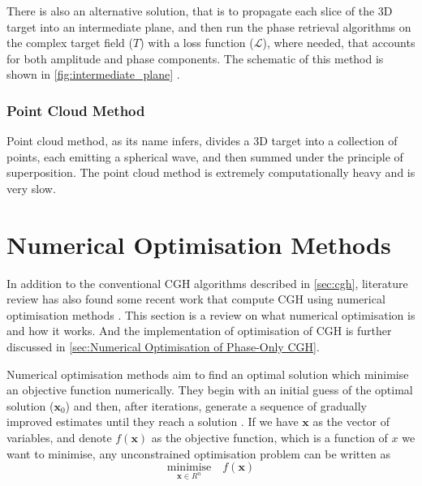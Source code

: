 There is also an alternative solution, that is to propagate each slice of the 3D target into an intermediate plane, and then run the phase retrieval algorithms on the complex target field ($T$) with a loss function ($\mathcal{L} $), where needed, that accounts for both amplitude and phase components. The schematic of this method is shown in \cref{fig:intermediate_plane} \cite{Chen2021}.


\subsubsection{Point Cloud Method}
Point cloud method, as its name infers, divides a 3D target into a collection of points, each emitting a spherical wave, and then summed under the principle of superposition. The point cloud method is extremely computationally heavy and is very slow.



\newpage
\section{Numerical Optimisation Methods} \label{sec:Numerical Optimisation Methods}
In addition to the conventional CGH algorithms described in \cref{sec:cgh}, literature review has also found some recent work that compute CGH using numerical optimisation methods \cite{Zhang2017, Liu2020, Choi2021, Chen2021, Kadis2022}. This section is a review on what numerical optimisation is and how it works. And the implementation of optimisation of CGH is further discussed in \cref{sec:Numerical Optimisation of Phase-Only CGH}.

Numerical optimisation methods aim to find an optimal solution which minimise an objective function numerically. They begin with an initial guess of the optimal solution ($\textbf{x}_{0}$) and then, after iterations, generate a sequence of gradually improved estimates until they reach a solution \cite{Nocedal2006}. If we have $\textbf{x}$ as the vector of variables, and denote $f(\textbf{x})$ as the objective function, which is a function of $x$ we want to minimise, any unconstrained optimisation problem can be written as
\begin{equation}
  \underset{\textbf{x}\in R^n}{\text{minimise}}\quad f(\textbf{x})
  \label{eq:minimise_F}
\end{equation}

